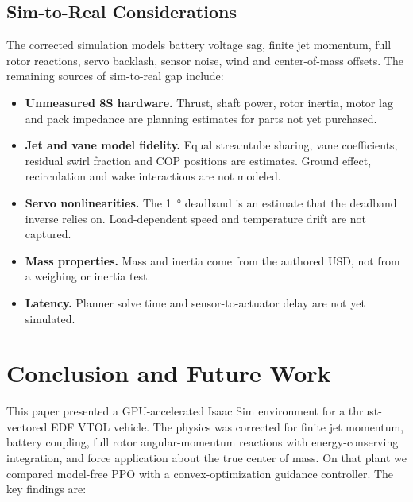 \documentclass[conference]{IEEEtran}
\begin{document}
\subsection{Sim-to-Real Considerations}

The corrected simulation models battery voltage sag, finite jet momentum, full rotor reactions, servo backlash, sensor noise, wind and center-of-mass offsets. The remaining sources of sim-to-real gap include:

\begin{itemize}
    \item \textbf{Unmeasured 8S hardware.} Thrust, shaft power, rotor inertia, motor lag and pack impedance are planning estimates for parts not yet purchased.
    \item \textbf{Jet and vane model fidelity.} Equal streamtube sharing, vane coefficients, residual swirl fraction and COP positions are estimates. Ground effect, recirculation and wake interactions are not modeled.
    \item \textbf{Servo nonlinearities.} The \SI{1}{\degree} deadband is an estimate that the deadband inverse relies on. Load-dependent speed and temperature drift are not captured.
    \item \textbf{Mass properties.} Mass and inertia come from the authored USD, not from a weighing or inertia test.
    \item \textbf{Latency.} Planner solve time and sensor-to-actuator delay are not yet simulated.
\end{itemize}


\section{Conclusion and Future Work}

This paper presented a GPU-accelerated Isaac Sim environment for a thrust-vectored EDF VTOL vehicle. The physics was corrected for finite jet momentum, battery coupling, full rotor angular-momentum reactions with energy-conserving integration, and force application about the true center of mass. On that plant we compared model-free PPO with a convex-optimization guidance controller. The key findings are:
\end{document}
